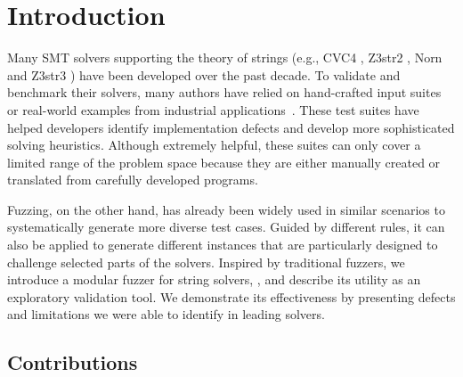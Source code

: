\section{Introduction}

    Many SMT solvers supporting the theory of strings (e.g., CVC4 \cite{cvc4},  Z3str2 \cite{z3str2}, Norn \cite{norn} and Z3str3 \cite{z3str3}) have been developed over the past decade. To validate and benchmark their solvers, many authors have relied on hand-crafted input suites~\cite{cvc4-tests,z3str3-tests,z3str2-tests} or real-world examples from industrial applications~\cite{kaluza,kausler}. These test suites have helped developers identify implementation defects and develop more sophisticated solving heuristics. Although extremely helpful, these suites can only cover a limited range of the problem space because they are either manually created or translated from carefully developed programs. 
    
    
    Fuzzing, on the other hand, has already been widely used in similar scenarios to systematically generate more diverse test cases. Guided by different rules, it can also be applied to generate different instances that are particularly designed to challenge selected parts of the solvers. Inspired by traditional fuzzers, we introduce a modular fuzzer for string solvers, \fuzzer{}, and describe its utility as an exploratory validation tool. We demonstrate its effectiveness by presenting defects and limitations we were able to identify in leading solvers.
    
    

    \subsection{Contributions}

